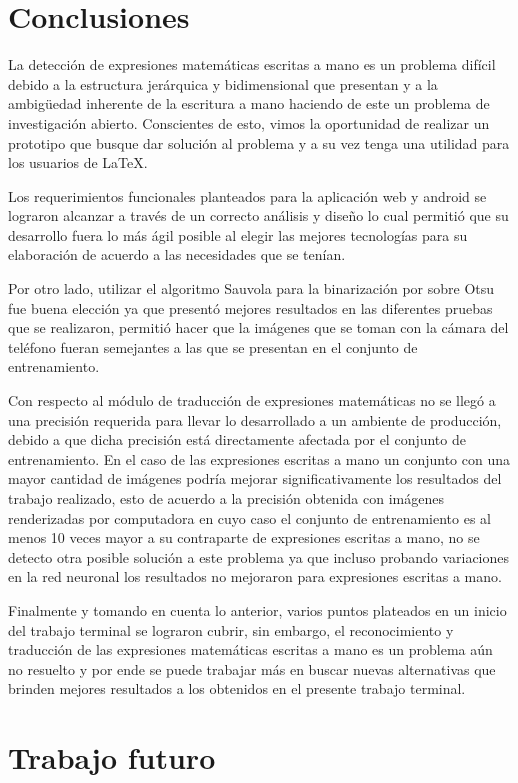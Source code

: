 \chapter{Conclusiones}
La detección de expresiones matemáticas escritas a mano es un problema difícil debido a la estructura jerárquica y bidimensional que presentan y a la ambigüedad inherente de la escritura a mano haciendo de este un problema de investigación abierto. Conscientes de esto, vimos la oportunidad de realizar un prototipo que busque dar solución al problema y a su vez tenga una utilidad para los usuarios de \LaTeX.

Los requerimientos funcionales planteados para la aplicación web y android se lograron alcanzar a través de un correcto análisis y diseño lo cual permitió que su desarrollo fuera lo más ágil posible al elegir las mejores tecnologías para su elaboración de acuerdo a las necesidades que se tenían.

Por otro lado, utilizar el algoritmo Sauvola para la binarización por sobre Otsu fue buena elección ya que presentó mejores resultados en las diferentes pruebas que se realizaron, permitió hacer que la imágenes que se toman con la cámara del teléfono fueran semejantes a las que se presentan en el conjunto de entrenamiento.

Con respecto al módulo de traducción de expresiones matemáticas no se llegó a una precisión requerida para llevar lo desarrollado a un ambiente de producción, debido a que dicha precisión está directamente afectada por el conjunto de entrenamiento. En el caso de las expresiones escritas a mano un conjunto con una mayor cantidad de imágenes podría mejorar significativamente los resultados del trabajo realizado, esto de acuerdo a la precisión obtenida con imágenes renderizadas por computadora en cuyo caso el conjunto de entrenamiento es al menos 10 veces mayor a su contraparte de expresiones escritas a mano, no se detecto otra posible solución a este problema ya que incluso probando variaciones en la red neuronal los resultados no mejoraron para expresiones escritas a mano.

Finalmente y tomando en cuenta lo anterior, varios puntos plateados en un inicio del trabajo terminal se lograron cubrir, sin embargo, el reconocimiento y traducción de las expresiones matemáticas escritas a mano es un problema aún no resuelto y por ende se puede trabajar más en buscar nuevas alternativas que brinden mejores resultados a los obtenidos en el presente trabajo terminal.

\chapter{Trabajo futuro}

